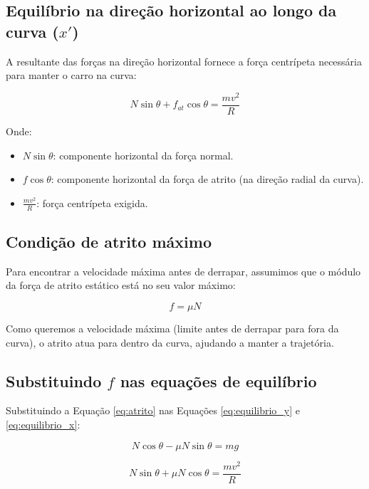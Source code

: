\documentclass[a4paper,12pt]{article}
\begin{document}
\begin{flushleft}
\subsection*{Equilíbrio na direção horizontal ao longo da curva (\( x' \))}

A resultante das forças na direção horizontal fornece a força centrípeta necessária para manter o carro na curva:

\begin{equation}
N \sin\theta + f_{at} \cos\theta = \frac{mv^2}{R}
\label{eq:equilibrio_x}
\end{equation}

Onde:

\begin{itemize}
  \item \( N \sin\theta \): componente horizontal da força normal.
  \item \( f \cos\theta \): componente horizontal da força de atrito (na direção radial da curva).
  \item \( \frac{mv^2}{R} \): força centrípeta exigida.
\end{itemize}

\subsection*{Condição de atrito máximo}

Para encontrar a velocidade máxima antes de derrapar, assumimos que o módulo da força de atrito estático está no seu valor máximo:

\begin{equation}
f = \mu N
\label{eq:atrito}
\end{equation}

Como queremos a velocidade máxima (limite antes de derrapar para fora da curva), o atrito atua para dentro da curva, ajudando a manter a trajetória.

\subsection*{Substituindo \( f \) nas equações de equilíbrio}

Substituindo a Equação \eqref{eq:atrito} nas Equações \eqref{eq:equilibrio_y} e \eqref{eq:equilibrio_x}:

\begin{equation}
N \cos\theta - \mu N \sin\theta = mg
\end{equation}

\begin{equation}
N \sin\theta + \mu N \cos\theta = \frac{mv^2}{R}
\end{equation}


\end{flushleft}
\end{document}
